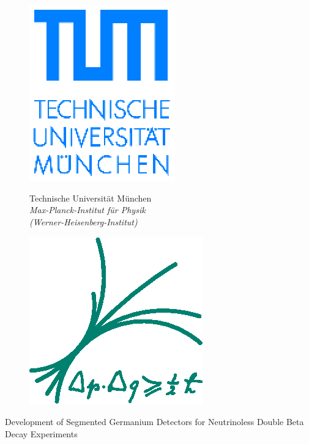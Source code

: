 \begin{titlepage}

\centering

\vspace{1.0cm}
\begin{figure}[t!]
\centering
\includegraphics[height=0.12\textheight]{TUM_logo}\hfil%
\begin{minipage}[b]{0.65\textwidth}\centering
\huge Technische Universit\"at M\"unchen\\\vspace{20pt}
\large \textit{Max-Planck-Institut f\"ur Physik\\
(Werner-Heisenberg-Institut)}
\end{minipage}\hfil%
\includegraphics[height=0.12\textheight]{MPP_logo}%
\end{figure}

\vspace{1. cm}

\huge Development of Segmented Germanium Detectors for Neutrinoless Double Beta Decay Experiments

\vspace{1.5 cm}


\end{titlepage}
